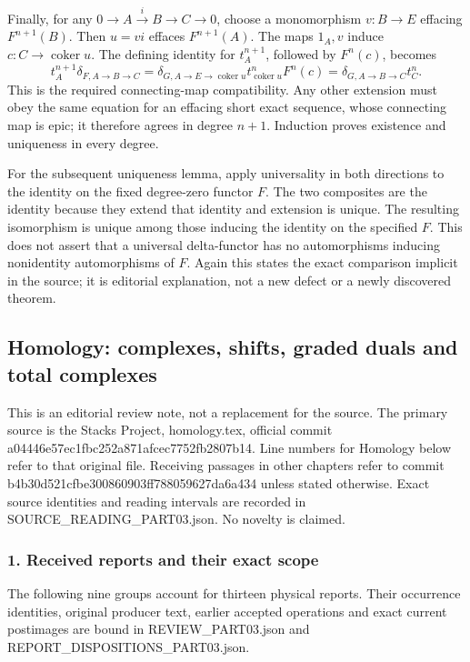 \documentclass[11pt]{article}
\begin{document}
Finally, for any \(0\to A\xrightarrow{i}B\to C\to0\), choose a monomorphism \(v:B\to E\) effacing \(F^{n+1}(B)\). Then \(u=vi\) effaces \(F^{n+1}(A)\). The maps \(1_A,v\) induce \(c:C\to\operatorname{coker}u\). The defining identity for \(t_A^{n+1}\), followed by \(F^n(c)\), becomes \[
t_A^{n+1}\delta_{F,A\to B\to C}
=\delta_{G,A\to E\to\operatorname{coker}u}
 t_{\operatorname{coker}u}^nF^n(c)
=\delta_{G,A\to B\to C}t_C^n.
\] This is the required connecting-map compatibility. Any other extension must obey the same equation for an effacing short exact sequence, whose connecting map is epic; it therefore agrees in degree \(n+1\). Induction proves existence and uniqueness in every degree.

For the subsequent uniqueness lemma, apply universality in both directions to the identity on the fixed degree-zero functor \(F\). The two composites are the identity because they extend that identity and extension is unique. The resulting isomorphism is unique among those inducing the identity on the specified \(F\). This does not assert that a universal delta-functor has no automorphisms inducing nonidentity automorphisms of \(F\). Again this states the exact comparison implicit in the source; it is editorial explanation, not a new defect or a newly discovered theorem.
\clearpage
\subsection{Homology: complexes, shifts, graded duals and total complexes}\label{homology-complexes-shifts-graded-duals-and-total-complexes}

This is an editorial review note, not a replacement for the source. The primary source is the Stacks Project, homology.tex, official commit a04446e57ec1fbc252a871afcec7752fb2807b14. Line numbers for Homology below refer to that original file. Receiving passages in other chapters refer to commit b4b30d521cfbe300860903ff788059627da6a434 unless stated otherwise. Exact source identities and reading intervals are recorded in SOURCE\_READING\_PART03.json. No novelty is claimed.

\subsubsection{1. Received reports and their exact scope}\label{received-reports-and-their-exact-scope}

The following nine groups account for thirteen physical reports. Their occurrence identities, original producer text, earlier accepted operations and exact current postimages are bound in REVIEW\_PART03.json and REPORT\_DISPOSITIONS\_PART03.json.
\end{document}
